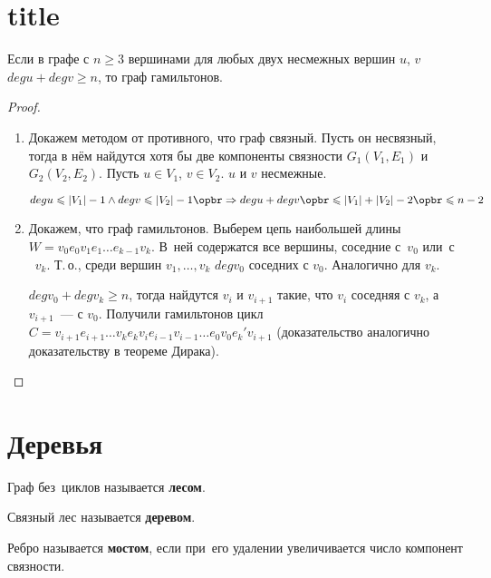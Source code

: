 \section{title}
\begin{theorem}[Оре, 1960]
	Если в графе с $n \geqslant 3$ вершинами для любых двух несмежных вершин $u$, $v$ $deg u + deg v \geqslant n$, то граф гамильтонов.
\end{theorem}
\begin{proof}
\begin{enumerate}
	\item Докажем методом от противного, что граф связный. Пусть он несвязный, тогда в нём найдутся хотя бы две компоненты связности $G_1(V_1, E_1)$ и $G_2(V_2, E_2)$. Пусть $u \in V_1$, $v \in V_2$. $u$ и $v$ несмежные.
	
	$deg u \leqslant |V_1| - 1 \land deg v \leqslant |V_2| - 1 \opbr\Rightarrow deg u + deg v \opbr\leqslant |V_1| + |V_2| - 2 \opbr\leqslant n - 2$
	
	\item Докажем, что граф гамильтонов. Выберем цепь наибольшей длины $W = v_0 e_0 v_1 e_1 \ldots e_{k-1} v_k$. В~ней содержатся все вершины, соседние с~$v_0$ или~с
	~$v_k$. Т.\,о., среди вершин $v_1, \ldots, v_k$ $deg v_0$ соседних с $v_0$. Аналогично для $v_k$.
	
	$deg v_0 + deg v_k \geqslant n$, тогда найдутся $v_i$ и $v_{i+1}$ такие, что $v_i$ соседняя с $v_k$, а $v_{i+1}$~--- с $v_0$. Получили гамильтонов цикл $C = v_{i+1} e_{i+1} \ldots v_k e_k v_i e_{i-1} v_{i-1} \ldots e_0 v_0 e_k' v_{i+1}$ (доказательство аналогично доказательству в теореме Дирака).
\end{enumerate}
\end{proof}

\section{Деревья}
\begin{definition}
	Граф без~циклов называется \textbf{лесом}.
\end{definition}

\begin{definition}
	Связный лес называется \textbf{деревом}.
\end{definition}

\begin{definition}
	Ребро называется \textbf{мостом}, если при~его удалении увеличивается число компонент связности.
\end{definition}

